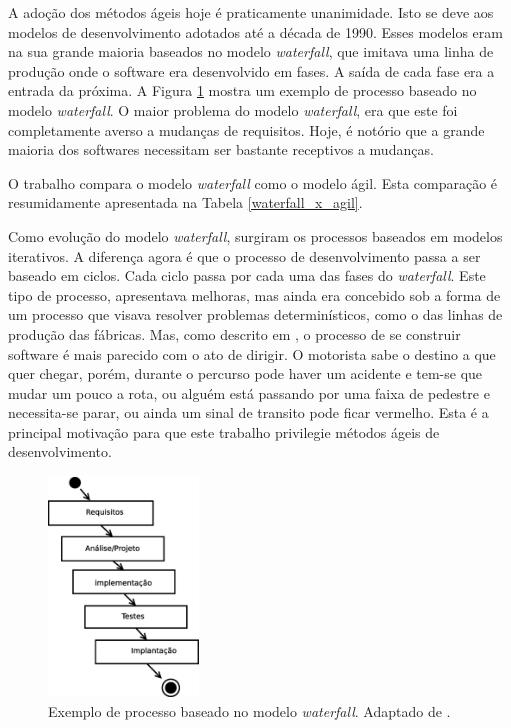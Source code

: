 A adoção dos métodos ágeis hoje é praticamente unanimidade. 
Isto se deve aos modelos de desenvolvimento adotados até a década de 1990. 
Esses modelos eram na sua grande maioria baseados no modelo \emph{waterfall}, que imitava uma linha de produção onde o software era desenvolvido em fases. 
A saída de cada fase era a entrada da próxima. 
A Figura \ref{waterfall} mostra um exemplo de processo baseado no modelo \emph{waterfall}.
O maior problema do modelo \emph{waterfall}, era que este foi completamente averso a mudanças de requisitos. 
Hoje, é notório que a grande maioria dos softwares necessitam ser bastante receptivos a mudanças.

O trabalho  compara o modelo \emph{waterfall} como o modelo ágil. 
Esta comparação é resumidamente apresentada na Tabela \ref{waterfall_x_agil}.

Como evolução do modelo \emph{waterfall}, surgiram os processos baseados em modelos iterativos. 
A diferença agora é que o processo de desenvolvimento passa a ser baseado em ciclos. 
Cada ciclo passa por cada uma das fases do \emph{waterfall}. 
Este tipo de processo, apresentava melhoras, mas ainda era concebido sob a forma de um processo que visava resolver problemas determinísticos, como o das linhas de produção das fábricas.
Mas, como descrito em , o processo de se construir software é mais parecido com o ato de dirigir.
O motorista sabe o destino a que quer chegar, porém, durante o percurso pode haver um acidente e tem-se que mudar um pouco a rota, ou alguém está passando por uma faixa de pedestre e necessita-se parar, ou ainda um sinal de transito pode ficar vermelho. 
Esta é a principal motivação para que este trabalho privilegie métodos ágeis de desenvolvimento.


\begin{figure}[ht]
	\centering
	\includegraphics[width=4cm]{figuras/waterfall.eps}
	\caption{Exemplo de processo baseado no modelo \emph{waterfall}. Adaptado de \cite{Pressman2014}.}
	\label{waterfall}
\end{figure}


